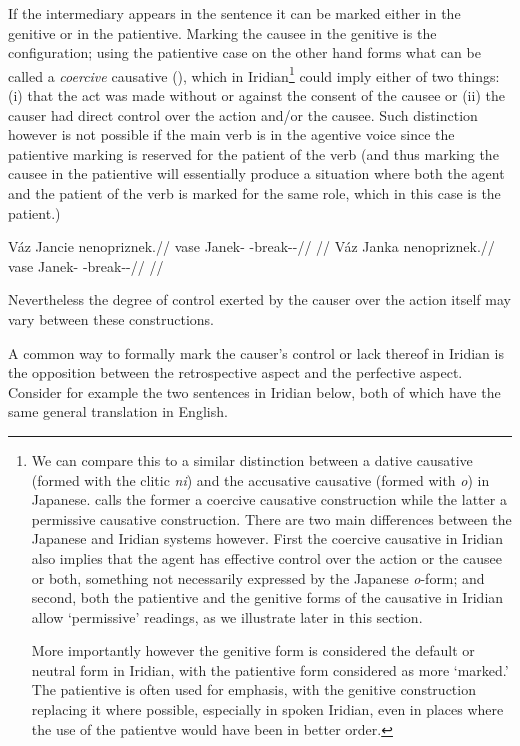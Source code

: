 If the intermediary appears in the sentence it can be marked either in the genitive or in the patientive. Marking the causee in the genitive is the  configuration; using the patientive case on the other hand forms what can be called a \emph{coercive} causative (\cite{shibatani1990,lehmann2006}), which in Iridian\footnote{We can compare this to a similar distinction between a dative causative (formed with the clitic \emph{ni}) and the accusative causative (formed with \emph{o}) in Japanese. \textcite{lehmann2006} calls the former a coercive causative construction while the latter a permissive causative construction. There are two main differences between the Japanese and Iridian systems however. First the coercive causative in Iridian also implies that the agent has effective control over the action or the causee or both, something not necessarily expressed by the Japanese \emph{o}-form; and second, both the patientive and the genitive forms of the causative in Iridian allow `permissive' readings, as we illustrate later in this section.

More importantly however the genitive form is considered the default or neutral form in Iridian, with the patientive form considered as more `marked.' The patientive is often used for emphasis, with the genitive construction replacing it where possible, especially in spoken Iridian, even in places where the use of the patientve would have been in better order.
}
could imply either of two things: (i) that the act was made without or against the consent of the causee or (ii) the causer had direct control over the action and/or the causee. Such distinction however is not possible if the main verb is in the agentive voice since the patientive marking is reserved for the patient of the verb (and thus marking the causee in the patientive will essentially produce a situation where both the agent and the patient of the verb is marked for the same role, which in this case is the patient.)

\pex
\a
\begingl
\gla Váz Jancie nenopriznek.//
\glb vase Janek-\Gen{} \Caus{}-break-\Pv{}-\Pf{}//
\glft {}//
\endgl
\a
\begingl
\gla Váz Janka nenopriznek.//
\glb vase Janek-\Pat{} \Caus{}-break-\Pv{}-\Pf{}//
\glft {}//
\endgl
\xe


Nevertheless the degree of control exerted by the causer over the action itself may vary between these constructions.

A common way to formally mark the causer's control or lack thereof in Iridian is the opposition between the retrospective aspect and the perfective aspect. Consider for example the two sentences in Iridian below, both of which have the same general translation in English.

